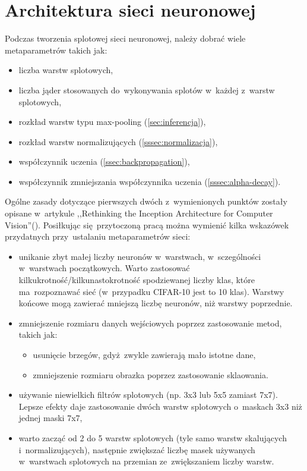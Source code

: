 \chapter{Architektura sieci neuronowej}
Podczas tworzenia splotowej sieci neuronowej, należy dobrać wiele metaparametrów takich jak:
\begin{itemize}
    \item liczba warstw splotowych,
    \item liczba jąder stosowanych do~wykonywania splotów w~każdej z~warstw splotowych,
    \item rozkład warstw typu max-pooling (\ref{sec:inferencja}),
    \item rozkład warstw normalizujących (\ref{sssec:normalizacja}),
    \item współczynnik uczenia (\ref{ssec:backpropagation}),
    \item współczynnik zmniejszania współczynnika uczenia (\ref{sssec:alpha-decay}).
\end{itemize}

Ogólne zasady dotyczące pierwszych dwóch z~wymienionych punktów zostały opisane w~artykule
,,Rethinking the Inception Architecture for Computer Vision''(\cite{RIACV}). Posiłkując się~przytoczoną pracą można
wymienić kilka wskazówek przydatnych przy~ustalaniu metaparametrów sieci:
\begin{itemize}
    \item unikanie zbyt małej liczby neuronów w~warstwach, w~sczególności w~warstwach początkowych. Warto zastosować
          kilkukrotność/kilkunastokrotność spodziewanej liczby klas, które ma~rozpoznawać sieć
          (w~przypadku CIFAR-10 jest to 10 klas). Warstwy końcowe mogą zawierać mniejszą liczbę neuronów, niż warstwy
          poprzednie.
    \item zmniejszenie rozmiaru danych wejściowych poprzez zastosowanie metod, takich jak:
          \begin{itemize}
              \item usunięcie brzegów, gdyż~zwykle zawierają mało istotne dane,
              \item zmniejszenie rozmiaru obrazka poprzez zastosowanie sklaowania.
          \end{itemize}
    \item używanie niewielkich filtrów splotowych (np. 3x3 lub 5x5 zamiast 7x7). Lepsze efekty daje zastosowanie dwóch
          warstw splotowych o~maskach 3x3 niż jednej maski 7x7,
    \item warto zacząć od 2 do 5 warstw splotowych (tyle samo warstw skalujących i~normalizujących), następnie zwiększać
          liczbę masek używanych w~warstwach splotowych na przemian ze~zwiększaniem liczby warstw.
\end{itemize}

